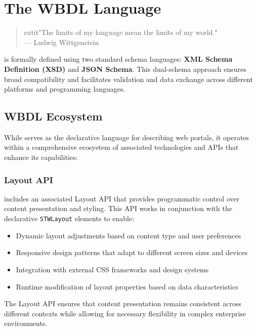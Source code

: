 
\chapter{The WBDL Language}
\label{chap:wbdl}

\begin{quote}
	extit{"The limits of my language mean the limits of my world."} \\
— Ludwig Wittgenstein
\end{quote}

\wbdl{} is formally defined using two standard schema languages: \textbf{XML Schema Definition (XSD)} and \textbf{JSON Schema}. This dual-schema approach ensures broad compatibility and facilitates validation and data exchange across different platforms and programming languages.

\section{WBDL Ecosystem}
\label{sec:wbdl-ecosystem}

While \wbdl{} serves as the declarative language for describing web portals, it operates within a comprehensive ecosystem of associated technologies and APIs that enhance its capabilities:

\subsection{Layout API}
\label{sec:layout-api}

\wbdl{} includes an associated Layout API that provides programmatic control over content presentation and styling. This API works in conjunction with the declarative \texttt{STWLayout} elements to enable:

\begin{itemize}
\item Dynamic layout adjustments based on content type and user preferences
\item Responsive design patterns that adapt to different screen sizes and devices
\item Integration with external CSS frameworks and design systems
\item Runtime modification of layout properties based on data characteristics
\end{itemize}

The Layout API ensures that content presentation remains consistent across different contexts while allowing for necessary flexibility in complex enterprise environments.

